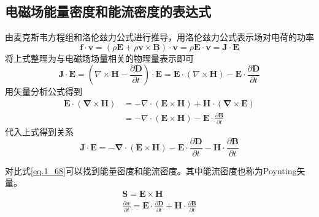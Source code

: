 			\subsection{电磁场能量密度和能流密度的表达式}
				由麦克斯韦方程组和洛伦兹力公式进行推导，用洛伦兹力公式表示场对电荷的功率
					\begin{equation}
						\boldsymbol{f} \cdot \boldsymbol{v}=(\rho \boldsymbol{E} + \rho \boldsymbol{v} \times \boldsymbol{B})\cdot \boldsymbol{v} = \rho \boldsymbol{E} \cdot \boldsymbol{v}=\boldsymbol{J} \cdot \boldsymbol{E}
					\end{equation}
				将上式整理为与电磁场场量相关的物理量表示即可
					\begin{equation*}
						\boldsymbol{J} \cdot \boldsymbol{E} = (\nabla \times \boldsymbol{H}-\frac{\partial \boldsymbol{D}}{\partial t})\cdot \boldsymbol{E} = \boldsymbol{E} \cdot (\nabla \times \boldsymbol{H})- \boldsymbol{E} \cdot \frac{\partial \boldsymbol{D}}{\partial t}
					\end{equation*}
				用矢量分析公式得到
					\begin{equation*}
						\begin{aligned}
						\boldsymbol{E} \cdot(\boldsymbol{\nabla} \times \boldsymbol{H}) &=-\nabla \cdot(\boldsymbol{E} \times \boldsymbol{H})+\boldsymbol{H} \cdot(\boldsymbol{\nabla} \times \boldsymbol{E}) \\
						&=-\nabla \cdot(\boldsymbol{E} \times \boldsymbol{H})-\boldsymbol{E} \cdot \frac{\partial \boldsymbol{B}}{\partial t}
						\end{aligned}
					\end{equation*}
				代入上式得到关系
				\begin{equation}
					\boldsymbol{J} \cdot \boldsymbol{E}=-\boldsymbol{\nabla} \cdot(\boldsymbol{E} \times \boldsymbol{H})-\boldsymbol{E} \cdot \frac{\partial \boldsymbol{D}}{\partial t}-\boldsymbol{H} \cdot \frac{\partial \boldsymbol{B}}{\partial t}
				\end{equation}

				对比式\ref{eq.1_68}可以找到能量密度和能流密度。其中能流密度也称为Poynting矢量。
				\begin{equation}
					\boxed{\begin{gathered}
					\boldsymbol{S}=\boldsymbol{E} \times \boldsymbol{H} \\
					\frac{\partial w}{\partial t}=\boldsymbol{E} \cdot \frac{\partial \boldsymbol{D}}{\partial t}+\boldsymbol{H} \cdot \frac{\partial \boldsymbol{B}}{\partial t}
					\end{gathered}}
				\end{equation}

